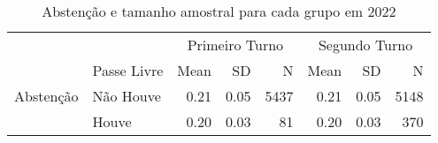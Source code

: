 
\begin{table}
\centering
\begin{tabular}[t]{llrrrrrr}
\toprule
\multicolumn{2}{c}{ } & \multicolumn{3}{c}{Primeiro Turno} & \multicolumn{3}{c}{Segundo Turno} \\
\cmidrule(l{3pt}r{3pt}){3-5} \cmidrule(l{3pt}r{3pt}){6-8}
  & Passe Livre & Mean & SD & N & Mean & SD & N\\
\midrule
Abstenção & Não Houve & \num{0.21} & \num{0.05} & 5437 & \num{0.21} & \num{0.05} & 5148\\
 & Houve & \num{0.20} & \num{0.03} & 81 & \num{0.20} & \num{0.03} & 370\\
\bottomrule
\end{tabular}
\caption{Abstenção e tamanho amostral para cada grupo em 2022}
\label{tab_descritiva}
\end{table}